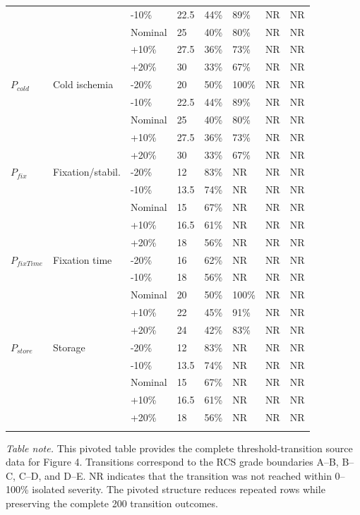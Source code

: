 \documentclass[preprint,12pt]{elsarticle}
\begin{document}
\begin{longtable}{@{}C{1.55cm} L{2.8cm} C{1.35cm} R{1.05cm} C{1.05cm} C{1.05cm} C{1.05cm} C{1.05cm}@{}}
 &  & -10\% & 22.5 & 44\% & 89\% & NR & NR \\
 &  & Nominal & 25 & 40\% & 80\% & NR & NR \\
 &  & +10\% & 27.5 & 36\% & 73\% & NR & NR \\
 &  & +20\% & 30 & 33\% & 67\% & NR & NR \\
\addlinespace[0.18em]
$P_{cold}$ & Cold ischemia & -20\% & 20 & 50\% & 100\% & NR & NR \\
 &  & -10\% & 22.5 & 44\% & 89\% & NR & NR \\
 &  & Nominal & 25 & 40\% & 80\% & NR & NR \\
 &  & +10\% & 27.5 & 36\% & 73\% & NR & NR \\
 &  & +20\% & 30 & 33\% & 67\% & NR & NR \\
\addlinespace[0.18em]
$P_{fix}$ & Fixation/stabil. & -20\% & 12 & 83\% & NR & NR & NR \\
 &  & -10\% & 13.5 & 74\% & NR & NR & NR \\
 &  & Nominal & 15 & 67\% & NR & NR & NR \\
 &  & +10\% & 16.5 & 61\% & NR & NR & NR \\
 &  & +20\% & 18 & 56\% & NR & NR & NR \\
\addlinespace[0.18em]
$P_{fixTime}$ & Fixation time & -20\% & 16 & 62\% & NR & NR & NR \\
 &  & -10\% & 18 & 56\% & NR & NR & NR \\
 &  & Nominal & 20 & 50\% & 100\% & NR & NR \\
 &  & +10\% & 22 & 45\% & 91\% & NR & NR \\
 &  & +20\% & 24 & 42\% & 83\% & NR & NR \\
\addlinespace[0.18em]
$P_{store}$ & Storage & -20\% & 12 & 83\% & NR & NR & NR \\
 &  & -10\% & 13.5 & 74\% & NR & NR & NR \\
 &  & Nominal & 15 & 67\% & NR & NR & NR \\
 &  & +10\% & 16.5 & 61\% & NR & NR & NR \\
 &  & +20\% & 18 & 56\% & NR & NR & NR \\
\addlinespace[0.18em]
\end{longtable}
\normalsize

\noindent\footnotesize
\textit{Table note.} This pivoted table provides the complete threshold-transition source data for Figure 4. Transitions correspond to the RCS grade boundaries A--B, B--C, C--D, and D--E. NR indicates that the transition was not reached within 0--100\% isolated severity. The pivoted structure reduces repeated rows while preserving the complete 200 transition outcomes.
\normalsize
\par\vspace{1.85em}
\endgroup
\end{document}
